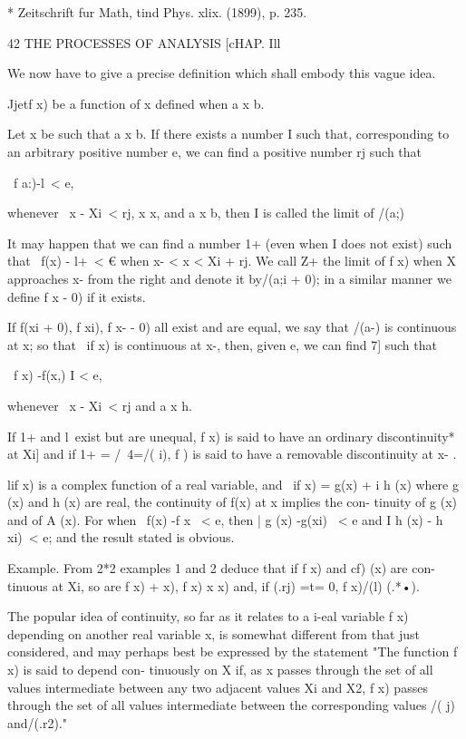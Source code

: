 * Zeitschrift fur Math, tind Phys. xlix. (1899), p. 235.



42 THE PROCESSES OF ANALYSIS [cHAP. Ill

We now have to give a precise definition which shall embody this vague
idea.

Jjetf x) be a function of x defined when a x b.

Let x be such that a x b. If there exists a number I such that,
corresponding to an arbitrary positive number e, we can find a
positive number rj such that

\ f a:)-l\ < e,

whenever \ x - Xi\ < rj, x x, and a x b, then I is called the limit
of /(a;)

It may happen that we can find a number 1+ (even when I does not
exist) such that \ f(x) - l+\ < € when x- < x < Xi + rj. We call Z+
the limit of f x) when X approaches x- from the right and denote it
by/(a;i + 0); in a similar manner we define f x - 0) if it exists.

If f(xi + 0), f xi), f x- - 0) all exist and are equal, we say that
/(a-) is continuous at x; so that \ if x) is continuous at x-, then,
given e, we can find 7] such that

\ f x) -f(x,) I < e,

whenever \ x - Xi\ < rj and a x h.

If 1+ and l\ exist but are unequal, f x) is said to have an ordinary
discontinuity* at Xi] and if 1+ = /\ 4=/( i), f ) is said to have a
removable discontinuity at x- .

lif x) is a complex function of a real variable, and \ if x) = g(x) +
i h (x) where g (x) and h (x) are real, the continuity of f(x) at x
implies the con- tinuity of g (x) and of A (x). For when \ f(x) -f x \
< e, then | g (x) -g(xi) \ < e and I h (x) - h xi)\ < e; and the
result stated is obvious.

Example. From 2*2 examples 1 and 2 deduce that if f x) and cf) (x) are
con- tinuous at Xi, so are f x) + x), f x) x x) and, if (.rj) =t= 0,
f x)/(l) (.*•).

The popular idea of continuity, so far as it relates to a i-eal
variable f x) depending on another real variable x, is somewhat
different from that just considered, and may perhaps best be expressed
by the statement "The function f x) is said to depend con- tinuously
on X if, as x passes through the set of all values intermediate
between any two adjacent values Xi and X2, f x) passes through the set
of all values intermediate between the corresponding values /( j)
and/(.r2)."

